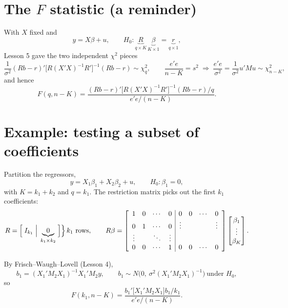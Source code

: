 \documentclass[11pt]{article}
\begin{document}

\section{The $F$ statistic (a reminder)}

With $X$ fixed and
\[ y = X\beta + u, \qquad
   H_{0} : \underbrace{R}_{q\times K}\,\underbrace{\beta}_{K\times1} = \underbrace{r}_{q\times1}, \]
Lesson 5 gave the two independent $\chi^{2}$ pieces
\[ \frac{1}{\sigma^{2}}(Rb - r)'\bigl[R(X'X)^{-1}R'\bigr]^{-1}(Rb - r) \sim \chi^{2}_{q},
   \qquad
   \frac{e'e}{n - K} = s^{2} \;\Longrightarrow\; \frac{e'e}{\sigma^{2}} = \frac{1}{\sigma^{2}}u'Mu \sim \chi^{2}_{n-K}, \]
and hence
\[ F(q, n - K) = \frac{(Rb - r)'\bigl[R(X'X)^{-1}R'\bigr]^{-1}(Rb - r)/q}{e'e/(n - K)}. \]

\section{Example: testing a subset of coefficients}

Partition the regressors,
\[ y = X_{1}\beta_{1} + X_{2}\beta_{2} + u, \qquad H_{0} : \beta_{1} = 0, \]
with $K = k_{1} + k_{2}$ and $q = k_{1}$. The restriction matrix picks out the first
$k_{1}$ coefficients:
\[ R = \Bigl[\; I_{k_{1}} \;\Big|\; \underbrace{0}_{k_{1}\times k_{2}} \;\Bigr]\Bigr\}\,k_{1}\ \text{rows},
   \qquad
   R\beta = \left[\begin{array}{cccc|cccc}
     1 & 0 & \cdots & 0 & 0 & 0 & \cdots & 0\\
     0 & 1 & \cdots & 0 & \vdots & & & \vdots\\
     \vdots & & \ddots & \vdots & & & & \\
     0 & 0 & \cdots & 1 & 0 & 0 & \cdots & 0
   \end{array}\right]
   \begin{bmatrix} \beta_{1}\\ \vdots\\ \beta_{K} \end{bmatrix}. \]

By Frisch--Waugh--Lovell (Lesson 4),
\[ b_{1} = (X_{1}'M_{2}X_{1})^{-1}X_{1}'M_{2}y, \qquad
   b_{1} \sim N\bigl(0,\ \sigma^{2}(X_{1}'M_{2}X_{1})^{-1}\bigr) \ \text{under } H_{0}, \]
so
\[ F(k_{1}, n - K) = \frac{b_{1}'\bigl[X_{1}'M_{2}X_{1}\bigr]b_{1}/k_{1}}{e'e/(n - K)}. \]
\end{document}
